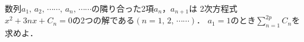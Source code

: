 \documentclass[../../main.tex]{subfiles}
\begin{document}
数列$a_1, \, a_2, \, \cdots\cdots, \, a_n, \, \cdots\cdots$の隣り合った2項$a_n$，$a_{n+1}$は
2次方程式$x^2+3nx+C_n=0$の2つの解である$(n=1, \, 2, \, \cdots\cdots)$．
$a_1=1$のとき$\displaystyle\sum_{n=1}^{2p}C_n$を求めよ．
\end{document}
